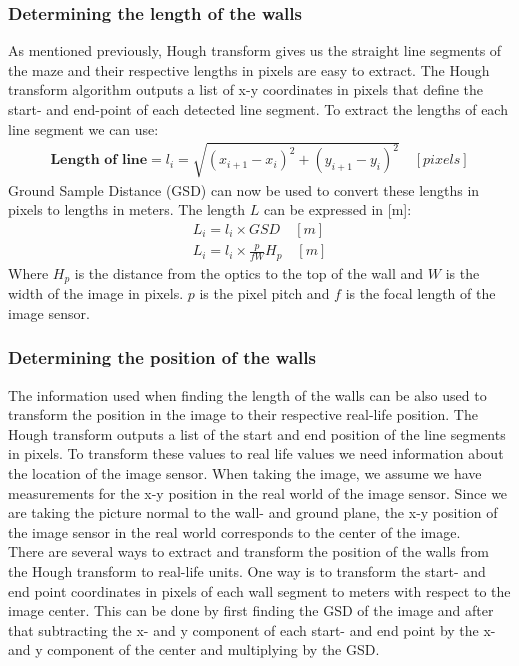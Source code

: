\subsubsection{Determining the length of the walls}
As mentioned previously, Hough transform gives us the straight line segments of the maze and their respective lengths in pixels are easy to extract. The Hough transform algorithm outputs a list of x-y coordinates in pixels that define the start- and end-point of each detected line segment. To extract the lengths of each line segment we can use:
\begin{align}
\textbf{Length of line} = l_i = \sqrt{(x_{i+1} - x_i)^2 + (y_{i+1} - y_i)^2 }\quad [pixels]
\end{align}
Ground Sample Distance (GSD) can now be used to convert these lengths in pixels to lengths in meters. The length $L$ can be expressed in [m]:
\begin{align}
L_i = l_i \times GSD\quad [m]\\
L_i = l_i \times \frac{p}{fW}H_p\quad [m]
\end{align}
Where $H_p$ is the distance from the optics to the top of the wall and $W$ is the width of the image in pixels. $p$ is the pixel pitch and $f$ is the focal length of the image sensor.  

\subsubsection{Determining the position of the walls}
The information used when finding the length of the walls can be also used to transform the position in the image to their respective real-life position. The Hough transform outputs a list of the start and end position of the line segments in pixels. To transform these values to real life values we need information about the location of the image sensor. When taking the image, we assume we have measurements for the x-y position in the real world of the image sensor. Since we are taking the picture normal to the wall- and ground plane, the x-y position of the image sensor in the real world corresponds to the center of the image.\\

There are several ways to extract and transform the position of the walls from the Hough transform to real-life units. One way is to transform the start- and end point coordinates in pixels of each wall segment to meters with respect to the image center. This can be done by first finding the GSD of the image and after that subtracting the x- and y component of each start- and end point by the x- and y component of the center and multiplying by the GSD.\\

